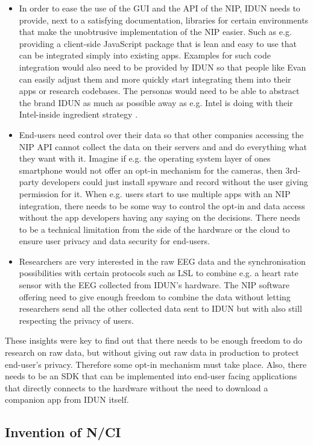 \begin{itemize}
  \item In order to ease the use of the GUI and the API of the NIP, IDUN needs to provide, next to a satisfying documentation, libraries for certain environments that make the unobtrusive implementation of the NIP easier. Such as e.g. providing a client-side JavaScript package that is lean and easy to use that can be integrated simply into existing apps. Examples for such code integration would also need to be provided by IDUN so that people like Evan can easily adjust them and more quickly start integrating them into their apps or research codebases. The personas would need to be able to abstract the brand IDUN as much as possible away as e.g. Intel is doing with their Intel-inside ingredient strategy \citep{intel_ingredient_nodate}.
  \item End-users need control over their data so that other companies accessing the NIP API cannot collect the data on their servers and and do everything what they want with it. Imagine if e.g. the operating system layer of ones smartphone would not offer an opt-in mechanism for the cameras, then 3rd-party developers could just install spyware and record without the user giving permission for it. When e.g. users start to use multiple apps with an NIP integration, there needs to be some way to control the opt-in and data access without the app developers having any saying on the decisions. There needs to be a technical limitation from the side of the hardware or the cloud to ensure user privacy and data security for end-users.
  \item Researchers are very interested in the raw EEG data and the synchronisation possibilities with certain protocols such as LSL to combine e.g. a heart rate sensor with the EEG collected from IDUN's hardware. The NIP software offering need to give enough freedom to combine the data without letting researchers send all the other collected data sent to IDUN but with also still respecting the privacy of users.
\end{itemize}

These insights were key to find out that there needs to be enough freedom to do research on raw data, but without giving out raw data in production to protect end-user's privacy. Therefore some opt-in mechanism must take place. Also, there needs to be an SDK that can be implemented into end-user facing applications that directly connects to the hardware without the need to download a companion app from IDUN itself.

\subsection{Invention of N/CI}
\label{chapter4-invention-of-nci}

